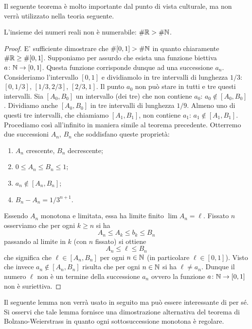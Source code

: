 Il seguente teorema è molto importante dal punto di vista
culturale, ma non verrà utilizzato nella teoria seguente.

\begin{theorem}
\label{th:cantor_secondo}%
%
%
%
%
L'insieme dei numeri reali non è numerabile: $\#\mathbb R > \#\mathbb N$.
\end{theorem}
%
\begin{proof}
E' sufficiente dimostrare che $\#[0,1] > \#\mathbb N$ in quanto
chiaramente $\#\mathbb R \ge \#[0,1]$.
Supponiamo per assurdo che esista una funzione biettiva $a\colon \mathbb N \to [0,1]$.
Questa funzione corrisponde dunque ad una successione $a_n$.
Consideriamo l'intervallo $[0,1]$ e dividiamolo in tre intervalli  di lunghezza $1/3$: $[0,1/3]$, $[1/3,2/3]$, $[2/3,1]$. Il punto $a_0$ non può stare in tutti e tre questi intervalli. Sia $[A_0,B_0]$ un intervallo (dei tre) che non contiene $a_0$: $a_0 \not \in [A_0,B_0]$.
Dividiamo anche $[A_0,B_0]$ in tre intervalli di lunghezza $1/9$.
Almeno uno di questi tre intervalli, che chiamiamo $[A_1,B_1]$,
non contiene $a_1$: $a_1 \not \in [A_1,B_1]$.
Procediamo così all'infinito in maniera simile al teorema precedente.
Otterremo due successioni $A_n$, $B_n$ che soddisfano queste proprietà:
\begin{enumerate}
\item $A_n$ crescente, $B_n$ decrescente;
\item $0\le A_n \le B_n \le 1$;
\item $a_n \not \in [A_n, B_n]$;
\item $B_n - A_n = 1/3^{n+1}$.
\end{enumerate}

Essendo $A_n$ monotona e limitata, essa ha limite finito $\lim A_n = \ell$.
Fissato $n$ osserviamo che per ogni $k\ge n$ si ha
\[
  A_n \le A_k \le b_k \le B_n
\]
passando al limite in $k$ (con $n$ fissato) si ottiene
\[
  A_n \le \ell \le B_n
\]
che significa che $\ell \in [A_n, B_n]$ per ogni $n\in \mathbb N$
(in particolare $\ell \in [0,1]$).
Visto che invece $a_n \not \in [A_n, B_n]$ risulta che per
ogni $n\in \mathbb N$ si ha $\ell \neq a_n$.
Dunque il numero $\ell$ non è un termine della successione $a_n$
ovvero la funzione $a\colon \mathbb N \to [0,1]$ non è suriettiva.
\end{proof}

Il seguente lemma
non verrà usato in seguito ma può essere interessante di per sé.
Si osservi che tale lemma fornisce una dimostrazione alternativa
del teorema di Bolzano-Weierstrass in quanto ogni sottosuccessione monotona
è regolare.


